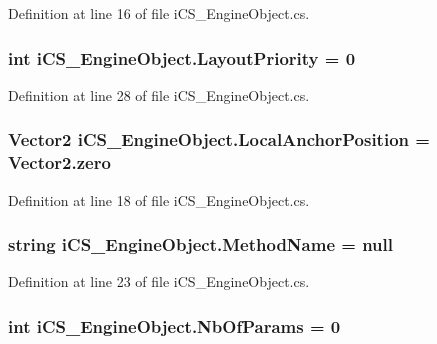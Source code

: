 Definition at line 16 of file i\+C\+S\+\_\+\+Engine\+Object.\+cs.

\hypertarget{classi_c_s___engine_object_a956e6c8642d808b685d99c6bc1ae15af}{
\subsubsection[{Layout\+Priority}]{\setlength{\rightskip}{0pt plus 5cm}int i\+C\+S\+\_\+\+Engine\+Object.\+Layout\+Priority = 0}}\label{classi_c_s___engine_object_a956e6c8642d808b685d99c6bc1ae15af}


Definition at line 28 of file i\+C\+S\+\_\+\+Engine\+Object.\+cs.

\hypertarget{classi_c_s___engine_object_a83490c7183dde7877042fba7143d2cf6}{
\subsubsection[{Local\+Anchor\+Position}]{\setlength{\rightskip}{0pt plus 5cm}Vector2 i\+C\+S\+\_\+\+Engine\+Object.\+Local\+Anchor\+Position = Vector2.\+zero}}\label{classi_c_s___engine_object_a83490c7183dde7877042fba7143d2cf6}


Definition at line 18 of file i\+C\+S\+\_\+\+Engine\+Object.\+cs.

\hypertarget{classi_c_s___engine_object_ae367637ea25e7910b31464b1d241c2c4}{
\subsubsection[{Method\+Name}]{\setlength{\rightskip}{0pt plus 5cm}string i\+C\+S\+\_\+\+Engine\+Object.\+Method\+Name = null}}\label{classi_c_s___engine_object_ae367637ea25e7910b31464b1d241c2c4}


Definition at line 23 of file i\+C\+S\+\_\+\+Engine\+Object.\+cs.

\hypertarget{classi_c_s___engine_object_a76ccc2cc9f8a0caaff59584f84d134cd}{
\subsubsection[{Nb\+Of\+Params}]{\setlength{\rightskip}{0pt plus 5cm}int i\+C\+S\+\_\+\+Engine\+Object.\+Nb\+Of\+Params = 0}}\label{classi_c_s___engine_object_a76ccc2cc9f8a0caaff59584f84d134cd}


